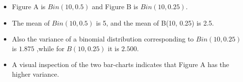 \documentclass[a4paper,12pt]{article}
\begin{document}
\begin{itemize}
\item Figure A is $Bin(10, 0.5)$ and Figure B is $Bin(10, 0.25)$.
\item The mean of $Bin(10, 0.5)$ is 5, and the mean of B(10, 0.25) is 2.5.
\item Also the variance of a binomial distribution corresponding to $Bin(10, 0.25)$ is $1.875$ ,while for $B(10, 0.25)$ it is $2.500$.
\item A visual inspection of the two bar-charts indicates that Figure A has the higher variance.
\end{itemize}

\end{document}
